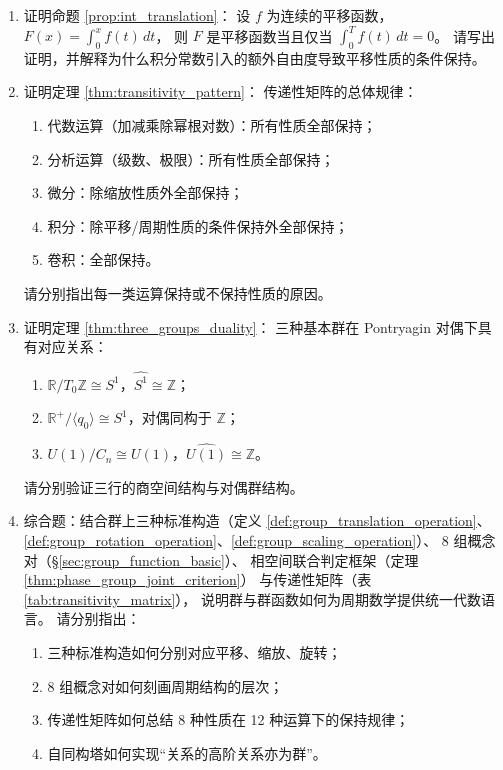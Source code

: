 \begin{enumerate}[leftmargin=3em, label=\textbf{题 \arabic*}]
    \item 证明命题 \ref{prop:int_translation}：
    设 $f$ 为连续的平移函数，$F(x)=\int_0^x f(t)\,dt$，
    则 $F$ 是平移函数当且仅当 $\int_0^Tf(t)\,dt=0$。
    请写出证明，并解释为什么积分常数引入的额外自由度导致平移性质的条件保持。

    \item 证明定理 \ref{thm:transitivity_pattern}：
    传递性矩阵的总体规律：
    \begin{enumerate}[label=(\roman*)]
        \item 代数运算（加减乘除幂根对数）：所有性质全部保持；
        \item 分析运算（级数、极限）：所有性质全部保持；
        \item 微分：除缩放性质外全部保持；
        \item 积分：除平移/周期性质的条件保持外全部保持；
        \item 卷积：全部保持。
    \end{enumerate}
    请分别指出每一类运算保持或不保持性质的原因。

    \item 证明定理 \ref{thm:three_groups_duality}：
    三种基本群在 Pontryagin 对偶下具有对应关系：
    \begin{enumerate}[label=(\roman*)]
        \item $\mathbb{R}/T_0\mathbb{Z}\cong S^1$，$\widehat{S^1}\cong\mathbb{Z}$；
        \item $\mathbb{R}^+/\langle q_0\rangle\cong S^1$，对偶同构于 $\mathbb{Z}$；
        \item $U(1)/C_n\cong U(1)$，$\widehat{U(1)}\cong\mathbb{Z}$。
    \end{enumerate}
    请分别验证三行的商空间结构与对偶群结构。

    \item 综合题：结合群上三种标准构造（定义 \ref{def:group_translation_operation}、
    \ref{def:group_rotation_operation}、\ref{def:group_scaling_operation}）、
    8 组概念对（\S\ref{sec:group_function_basic}）、
    相空间联合判定框架（定理 \ref{thm:phase_group_joint_criterion}）
    与传递性矩阵（表 \ref{tab:transitivity_matrix}），
    说明群与群函数如何为周期数学提供统一代数语言。
    请分别指出：
    \begin{enumerate}[label=(\roman*)]
        \item 三种标准构造如何分别对应平移、缩放、旋转；
        \item 8 组概念对如何刻画周期结构的层次；
        \item 传递性矩阵如何总结 8 种性质在 12 种运算下的保持规律；
        \item 自同构塔如何实现“关系的高阶关系亦为群”。
    \end{enumerate}
\end{enumerate}

